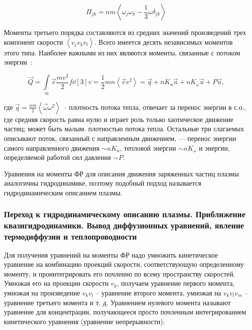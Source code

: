 \documentclass[10pt, a4paper]{article}
\begin{document}
\begin{equation*}
		\Pi_{jk} = nm\left\langle \omega_j\omega_k-\frac{1}{3}\omega\delta_{jk}\right\rangle 
\end{equation*}

Моменты третьего порядка составляются из средних значений произведений трех компонент скорости $\left\langle v_jv_kv_l\right\rangle $. Всего имеется десять независимых моментов этого типа. Наиболее важными из них являются моменты, связанные с потоком энергии~\cite{golant}:

\begin{equation} \label{eq:energy_flux}
	\vec{Q}=\int\limits_\infty\vec{v}\frac{mv^2}{2}f\dd[3]{v}=\frac{1}{2}mn\left\langle \vec{v}v^2\right\rangle = \vec{q} + nK_u\vec{u}+nK_\omega\vec{u}+P\vec{u},
\end{equation}

где $\vec{q}=\frac{nm}{2}\left\langle\vec{\omega}\omega^2 \right\rangle $ -- плотность потока тепла, отвечает за перенос энергии в с.о., где средняя скорость равна нулю и играет роль только хаотическое движение частиц; может быть малым. плотностью потока тепла. Остальные три слагаемых описывают поток, связанный с направленным движением, — перенос энергии самого направленного движения $\sim nK_u$, тепловой энергии $\sim nK_\omega$
и энергии, определяемой работой сил давления $\sim P$.

Уравнения на моменты ФР для описания движения заряженных частиц плазмы аналогичны гидродинамике, поэтому подобный подход называется гидродинамическим описанием плазмы. 

\subsubsection{Переход к гидродинамическому описанию плазмы. Приближение квазигидродинамики. Вывод диффузионных уравнений, явление термодиффузии и теплопроводности} \label{subsubsec:hydrodynamic_description}

Для получения уравнений на моменты ФР надо умножить кинетическое уравнение на комбинацию проекций скорости, соответствующую определенному моменту, и проинтегрировать его почленно по всему пространству скоростей. Умножая его на проекции скорости $v_k$, получаем уравнение первого момента, умножая на произведение $v_kv_l$ -- уравнение второго момента, умножая на $v_kv_lv_m$ -- уравнение третьего момента и т. д. Уравнением нулевого момента называют уравнение для концентрации, получающееся просто почленным интегрированием кинетического уравнения (уравнение непрерывности):
\end{document}
